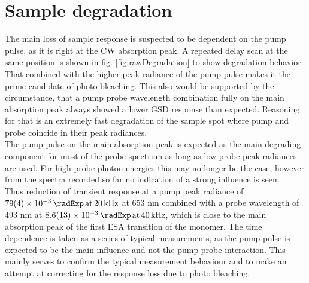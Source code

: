 \documentclass[twoside,openright]{scrreprt}
\def\pumpExp#1{\ensuremath{\SI{#1}{\radExp}\,\mathrm{at}\, \SI{20}{\kilo\hertz}}}
\def\probeExp#1{\ensuremath{\SI{#1}{\radExp}\,\mathrm{at}\, \SI{40}{\kilo\hertz}}}
\begin{document}
\section{Sample degradation}\label{sec:degradation}
The main loss of sample response is suspected to be dependent on the pump pulse, as it is right at the CW absorption peak. A repeated delay scan at the same position is shown in fig. \ref{fig:rawDegradation} to show degradation behavior. That combined with the higher peak radiance of the pump pulse makes it the prime candidate of photo bleaching. This also would be supported by the circumstance, that a pump probe wavelength combination fully on the main absorption peak always showed a lower GSD response than expected. Reasoning for that is an extremely fast degradation of the sample spot where pump and probe coincide in their peak radiances.\\
The pump pulse on the main absorption peak is expected as the main degrading component for most of the probe spectrum as long as low probe peak radiances are used. For high probe photon energies this may no longer be the case, however from the spectra recorded so far no indication of a strong influence is seen.\\
Thus reduction of transient response at a pump peak radiance of \pumpExp{79(4)e-3} at 653 nm combined with a probe wavelength of 493 nm at \probeExp{8.6(1.3)e-3}, which is close to the main absorption peak of the first ESA transition of the monomer. The time dependence is taken as a series of typical measurements, as the pump pulse is expected to be the main influence and not the pump probe interaction. This mainly serves to confirm the typical measurement behaviour and to make an attempt at correcting for the response loss due to photo bleaching.
\end{document}
